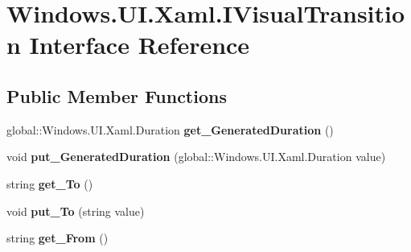 \hypertarget{interface_windows_1_1_u_i_1_1_xaml_1_1_i_visual_transition}{}\section{Windows.\+U\+I.\+Xaml.\+I\+Visual\+Transition Interface Reference}
\label{interface_windows_1_1_u_i_1_1_xaml_1_1_i_visual_transition}
\subsection*{Public Member Functions}
\begin{DoxyCompactItemize}
\item 
\mbox{\label{interface_windows_1_1_u_i_1_1_xaml_1_1_i_visual_transition_a09cacef636663545b9f3969686498197}} 
global\+::\+Windows.\+U\+I.\+Xaml.\+Duration {\bfseries get\+\_\+\+Generated\+Duration} ()
\item 
\mbox{\label{interface_windows_1_1_u_i_1_1_xaml_1_1_i_visual_transition_a9eeef6c9dd27db1e0a9d8951d3577e36}} 
void {\bfseries put\+\_\+\+Generated\+Duration} (global\+::\+Windows.\+U\+I.\+Xaml.\+Duration value)
\item 
\mbox{\label{interface_windows_1_1_u_i_1_1_xaml_1_1_i_visual_transition_aaa4594cccc2a043cd3cd99e9f5ea9668}} 
string {\bfseries get\+\_\+\+To} ()
\item 
\mbox{\label{interface_windows_1_1_u_i_1_1_xaml_1_1_i_visual_transition_a4ab6dd04f74a00e19e0faf126a5e040d}} 
void {\bfseries put\+\_\+\+To} (string value)
\item 
\mbox{\label{interface_windows_1_1_u_i_1_1_xaml_1_1_i_visual_transition_a1b4b88636fb838d2b6ce275f634f82f1}} 
string {\bfseries get\+\_\+\+From} ()
\item 
\mbox{\label{interface_windows_1_1_u_i_1_1_xaml_1_1_i_visual_transition_a8ee00acb9f48f20860a41022c311666b}} 

\end{DoxyCompactItemize}
